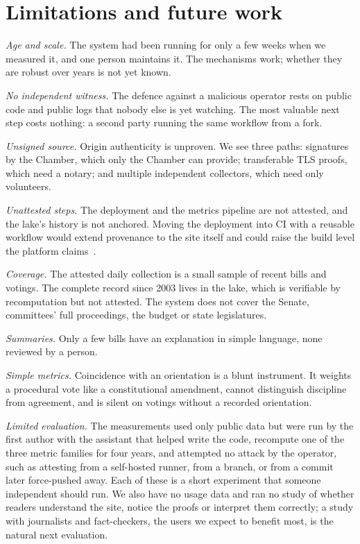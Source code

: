 \section{Limitations and future work}
\label{sec:limits}

\emph{Age and scale.} The system had been running for only a few weeks when we measured it, and one person maintains it. The mechanisms work; whether they are robust over years is not yet known.

\emph{No independent witness.} The defence against a malicious operator rests on public code and public logs that nobody else is yet watching. The most valuable next step costs nothing: a second party running the same workflow from a fork.

\emph{Unsigned source.} Origin authenticity is unproven. We see three paths: signatures by the Chamber, which only the Chamber can provide; transferable TLS proofs, which need a notary; and multiple independent collectors, which need only volunteers.

\emph{Unattested steps.} The deployment and the metrics pipeline are not attested, and the lake's history is not anchored. Moving the deployment into CI with a reusable workflow would extend provenance to the site itself and could raise the build level the platform claims~\citep{github-slsa3}.

\emph{Coverage.} The attested daily collection is a small sample of recent bills and votings. The complete record since 2003 lives in the lake, which is verifiable by recomputation but not attested. The system does not cover the Senate, committees' full proceedings, the budget or state legislatures.

\emph{Summaries.} Only a few bills have an explanation in simple language, none reviewed by a person.

\emph{Simple metrics.} Coincidence with an orientation is a blunt instrument. It weights a procedural vote like a constitutional amendment, cannot distinguish discipline from agreement, and is silent on votings without a recorded orientation.

\emph{Limited evaluation.} The measurements used only public data but were run by the first author with the assistant that helped write the code, recompute one of the three metric families for four years, and attempted no attack by the operator, such as attesting from a self-hosted runner, from a branch, or from a commit later force-pushed away. Each of these is a short experiment that someone independent should run. We also have no usage data and ran no study of whether readers understand the site, notice the proofs or interpret them correctly; a study with journalists and fact-checkers, the users we expect to benefit most, is the natural next evaluation.

